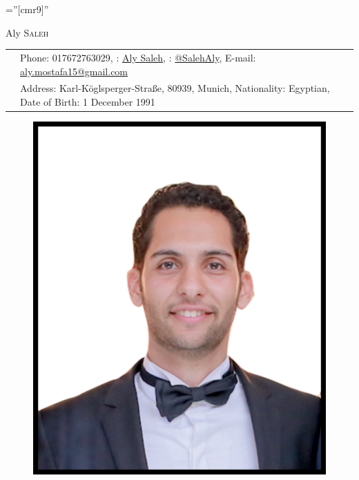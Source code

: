 \documentclass[a4paper,13pt]{article}
\begin{document}
\pagestyle{empty} %

\font\fb=''[cmr9]'' %


\par{\hspace{5cm}\huge Aly \textsc{Saleh}\par} %



\begin{adjustwidth}{-3cm}{}

\begin{tabular}{rl}
	& Phone: 017672763029, 
		\faLinkedin: \href{https://de.linkedin.com/in/aly-saleh-ba948164}{Aly Saleh}, 
		\faGithub:  \href{https://github.com/SalehAly}{@SalehAly}, 
 E-mail: 	\href{mailto:aly.mostafa15@gmail.com}{aly.mostafa15@gmail.com}
	\\& 
	Address: Karl-Köglsperger-Straße, 80939, Munich, 
	Nationality: Egyptian,  
	Date of Birth: 1 December 1991\\
\end{tabular}
\begin{figure}
	\begin{center}
	\hspace{14cm} \vspace{-3cm} \includegraphics[scale=0.07]{me.jpg}	
	\end{center}


\end{figure}
\end{adjustwidth}
\end{document}
